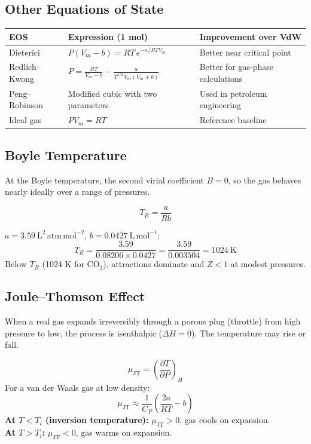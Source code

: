 \documentclass[12pt,a4paper]{article}
\begin{document}
\subsection{Other Equations of State}

\begin{tabularx}{\linewidth}{|B{2.6cm}|Y|Y|}
\hline
\textbf{EOS} & \textbf{Expression (1 mol)} & \textbf{Improvement over VdW} \\
\hline
Dieterici & $P(V_m-b)=RT\,e^{-a/RTV_m}$ & Better near critical point \\
\hline
Redlich--Kwong & $P=\displaystyle\frac{RT}{V_m-b}-\frac{a}{T^{1/2}V_m(V_m+b)}$ & Better for gas-phase calculations \\
\hline
Peng--Robinson & Modified cubic with two parameters & Used in petroleum engineering \\
\hline
Ideal gas & $PV_m = RT$ & Reference baseline \\
\hline
\end{tabularx}

\subsection{Boyle Temperature}
At the Boyle temperature, the second virial coefficient $B = 0$, so the gas behaves nearly ideally over a range of pressures.

\begin{tcolorbox}[formulabox, title={Boyle Temperature for a van der Waals Gas}]
\[
T_B = \frac{a}{Rb}
\]
\end{tcolorbox}

\begin{tcolorbox}[examplebox, title={Solved Example: Boyle Temperature of \texorpdfstring{$\mathrm{CO_2}$}{CO2}}]
$a=3.59\ \mathrm{L^2\,atm\,mol^{-2}}$, $b=0.0427\ \mathrm{L\,mol^{-1}}$:
\[
T_B = \frac{3.59}{0.08206\times0.0427} = \frac{3.59}{0.003504} = 1024\ \mathrm{K}
\]
Below $T_B$ (1024 K for $\mathrm{CO_2}$), attractions dominate and $Z<1$ at modest pressures.
\end{tcolorbox}

\subsection{Joule--Thomson Effect}
When a real gas expands irreversibly through a porous plug (throttle) from high pressure to low, the process is isenthalpic ($\Delta H = 0$). The temperature may rise or fall.

\begin{tcolorbox}[formulabox, title={Joule--Thomson Coefficient}]
\[
\mu_{\mathrm{JT}} = \left(\frac{\partial T}{\partial P}\right)_H
\]
For a van der Waals gas at low density:
\[
\mu_{\mathrm{JT}} \approx \frac{1}{C_P}\!\left(\frac{2a}{RT} - b\right)
\]
\textbf{At $T < T_i$ (inversion temperature):} $\mu_{\mathrm{JT}} > 0$, gas cools on expansion.\\
\textbf{At $T > T_i$:} $\mu_{\mathrm{JT}} < 0$, gas warms on expansion.
\end{tcolorbox}
\end{document}
